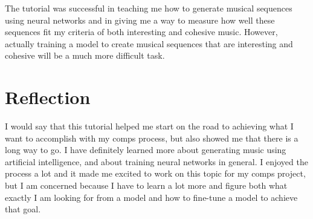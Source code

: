\documentclass[10pt,twocolumn]{article}
\begin{document}
The tutorial was successful in teaching me how to generate musical sequences using neural networks and in giving me a way to measure how well these sequences fit my criteria of both interesting and cohesive music. However, actually training a model to create musical sequences that are interesting and cohesive will be a much more difficult task.


\section{Reflection}

I would say that this tutorial helped me start on the road to achieving what I want to accomplish with my comps process, but also showed me that there is a long way to go. I have definitely learned more about generating music using artificial intelligence, and about training neural networks in general. I enjoyed the process a lot and it made me excited to work on this topic for my comps project, but I am concerned because I have to learn a lot more and figure both what exactly I am looking for from a model and how to fine-tune a model to achieve that goal.

\printbibliography
\end{document}
